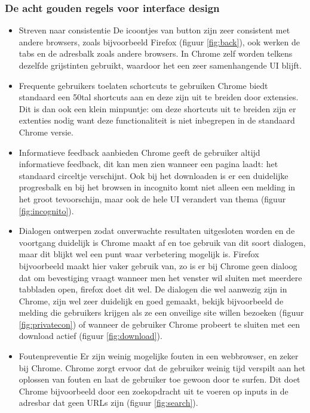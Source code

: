 \documentclass[12pt]{article}
\begin{document}
\subsubsection{De acht gouden regels voor interface design}
\begin{itemize}
	\item Streven naar consistentie
	\newline
	De icoontjes van button zijn zeer consistent met andere browsers, zoals bijvoorbeeld Firefox (figuur \ref{fig:back}), ook werken de tabs en de adresbalk zoals andere browsers. In Chrome zelf worden telkens dezelfde grijstinten gebruikt, waardoor het een zeer samenhangende UI blijft.
	\item Frequente gebruikers toelaten schortcuts te gebruiken
	\newline
	Chrome biedt standaard een 50tal shortcuts aan\cite{shortcuts} en deze zijn uit te breiden door extensies. Dit is dan ook een klein minpuntje: om deze shortcuts uit te breiden zijn er extenties nodig want deze functionaliteit is niet inbegrepen in de standaard Chrome versie.
	\item Informatieve feedback aanbieden
	\newline
	Chrome geeft de gebruiker altijd informatieve feedback, dit kan men zien wanneer een pagina laadt: het standaard circeltje verschijnt. Ook bij het downloaden is er een duidelijke progresbalk en bij het browsen in incognito komt niet alleen een melding in het groot tevoorschijn, maar ook de hele UI verandert van thema (figuur \ref{fig:incognito}).
	\item Dialogen ontwerpen zodat onverwachte resultaten uitgesloten worden en de voortgang duidelijk is
	\newline
	Chrome maakt af en toe gebruik van dit soort dialogen, maar dit blijkt wel een punt waar verbetering mogelijk is. Firefox bijvoorbeeld maakt hier vaker gebruik van, zo is er bij Chrome geen dialoog dat om bevestiging vraagt wanneer men het venster wil sluiten met meerdere tabbladen open, firefox doet dit wel. De dialogen die wel aanwezig zijn in Chrome, zijn wel zeer duidelijk en goed gemaakt, bekijk bijvoorbeeld de melding die gebruikers krijgen als ze een onveilige site willen bezoeken (figuur \ref{fig:privatecon}) of wanneer de gebruiker Chrome probeert te sluiten met een download actief (figuur \ref{fig:download}).
	\item Foutenpreventie
	\newline
	Er zijn weinig mogelijke fouten in een webbrowser, en zeker bij Chrome. Chrome zorgt ervoor dat de gebruiker weinig tijd verspilt aan het oplossen van fouten en laat de gebruiker toe gewoon door te surfen. Dit doet Chrome bijvoorbeeld door een zoekopdracht uit te voeren op inputs in de adresbar dat geen URLs zijn (figuur \ref{fig:search}).

\end{itemize}
\end{document}
